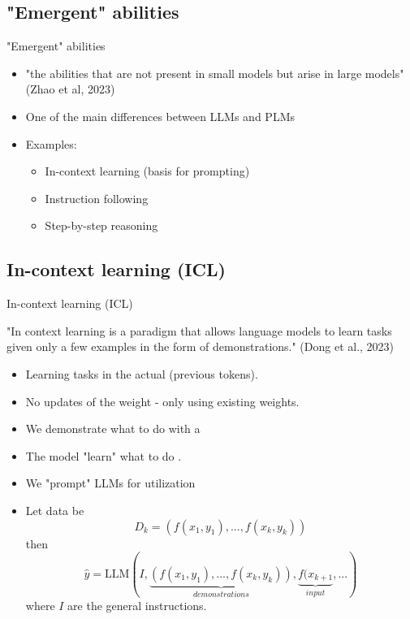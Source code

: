 \documentclass[10pt]{beamer}
\begin{document}

\subsection{"Emergent" abilities}

\begin{frame}{"Emergent" abilities}
\begin{itemize}
\item "the abilities that are not present in small models but arise in large models" (Zhao et al, 2023)\pause
\item One of the main differences between LLMs and PLMs
\item Examples:
\begin{itemize}
\item In-context learning (basis for prompting)
\item Instruction following %
\item Step-by-step reasoning
\end{itemize}
\end{itemize}

\end{frame}

\subsection{In-context learning (ICL)}

\begin{frame}{In-context learning (ICL)}

"In context learning is a paradigm that allows language models to learn tasks given only a few examples in the form of demonstrations." (Dong et al., 2023)

\begin{itemize}
\item Learning tasks in the actual  (previous tokens).
\pause
\item No updates of the weight - only using existing weights.
\pause
\item We demonstrate what to do with a 
\pause
\item The model "learn" what to do .
\pause
\item We "prompt" LLMs for utilization
\item Let data be
\[
D_k = \left(f(x_1, y_1),...,f(x_k, y_k) \right)
\]
then
\[
\hat{y} = \text{LLM}(I, \underbrace{\left(f(x_1, y_1),...,f(x_k, y_k)\right)}_{demonstrations}, \underbrace{f(x_{k+1}}_{input} , ...)
\]
where $I$ are the general instructions.

\end{itemize}


\end{frame}
\end{document}
